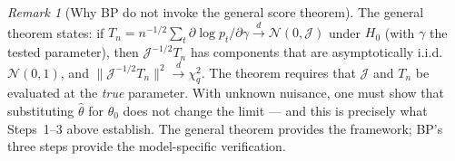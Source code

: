 \documentclass[a4paper,oneside,12pt]{extarticle}
\theoremstyle{plain}
\theoremstyle{definition}
\theoremstyle{remark}
\newtheorem{remark}[proposition]{Remark}
\begin{document}
\begin{remark}[Why BP do not invoke the general score theorem]
The general theorem states: if $T_n = n^{-1/2}\sum_t \partial\log p_t/
\partial\gamma \xrightarrow{d} \mathcal{N}(0,\mathcal{J})$ under $H_0$
(with $\gamma$ the tested parameter), then $\mathcal{J}^{-1/2}T_n$
has components that are asymptotically i.i.d.\ $\mathcal{N}(0,1)$, and
$\|{\mathcal{J}^{-1/2}T_n}\|^2 \xrightarrow{d} \chi^2_q$.  The theorem
requires that $\mathcal{J}$ and $T_n$ be evaluated at the \emph{true}
parameter.  With unknown nuisance, one must show that substituting
$\hat\theta$ for $\theta_0$ does not change the limit — and this is
precisely what Steps~1--3 above establish.  The general theorem
provides the framework; BP's three steps provide the model-specific
verification.
\end{remark}

\end{document}
